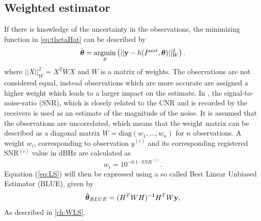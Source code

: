 \subsection{Weighted estimator}\label{globalWEstimator}
If there is knowledge of the uncertainty in the observations, the minimizing function in \ref{eq:thetaHat} can be described by
\begin{align}\label{eq:theta_hatW}
\hat{{\boldsymbol \theta}}=\operatorname*{argmin}_{\bf \theta}\left(||{\bf y}-h(P^{sat},{\boldsymbol \theta})||^2_W\right).
\end{align}
where $||X||^2_W=X^TWX$ and $W$ is a matrix of weights. The observations are not considered equal, instead observations which are more accurate are assigned a higher weight which leads to a larger impact on the estimate. In \cite{Brunner1999}, the signal-to-noise-ratio (SNR), which is closely related to the CNR and is recorded by the receivers is used as an estimate of the magnitude of the noise. It is assumed that the observations are uncorrelated, which means that the weight matrix can be described as a diagonal matrix $W=\text{diag}\left(w_1,\dots, w_n\right)$  for $n$ observations. A weight $w_i$, corresponding to observation $y^{(i)}$ and its corresponding registered SNR$^{(i)}$ value in dBHz are calculated as
\begin{equation}\label{SNRWeights}
w_i=10^{-0.1\cdot SNR^{(i)}}.
\end{equation}
Equation (\ref{eq:LS}) will then be expressed using a so called Best Linear Unbiased Estimator (BLUE), given by
\begin{align}\label{eq:WLS}
\hat{{\boldsymbol \theta}}_{BLUE}=(H^T W H)^{-1}H^T W{\bf y},
\end{align}
As described in \ref{ch:WLS}.\\

